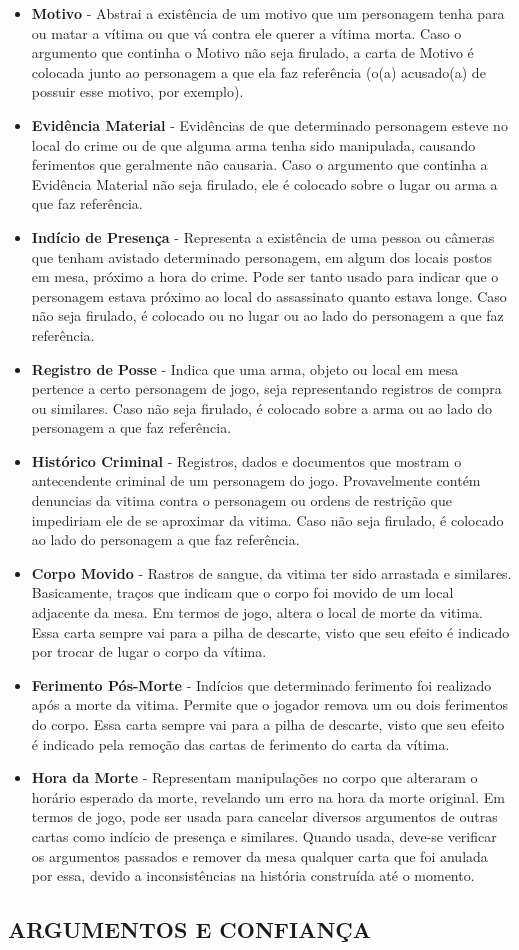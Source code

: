 \documentclass[a4paper, 11pt]{article}
\begin{document}
		\begin{itemize}
			\item \textbf{Motivo} - Abstrai a existência de um motivo que um personagem tenha para ou matar a vítima ou que vá contra ele querer a vítima morta. Caso o argumento que continha o Motivo não seja firulado, a carta de Motivo é colocada junto ao personagem a que ela faz referência (o(a) acusado(a) de possuir esse motivo, por exemplo).
			\item \textbf{Evidência Material} -  Evidências de que determinado personagem esteve no local do crime ou de que alguma arma tenha sido manipulada, causando ferimentos que geralmente não causaria. Caso o argumento que continha a Evidência Material não seja firulado, ele é colocado sobre o lugar ou arma a que faz referência.
			\item \textbf{Indício de Presença} - Representa a existência de uma pessoa ou câmeras que tenham avistado determinado personagem, em algum dos locais postos em mesa, próximo a hora do crime. Pode ser tanto usado para indicar que o personagem estava próximo ao local do assassinato quanto estava longe. Caso não seja firulado, é colocado ou no lugar ou ao lado do personagem a que faz referência.
			\item \textbf{Registro de Posse} - Indica que uma arma, objeto ou local em mesa pertence a certo personagem de jogo, seja representando registros de compra ou similares. Caso não seja firulado, é colocado sobre a arma ou ao lado do personagem a que faz referência.
			\item \textbf{Histórico Criminal} - Registros, dados e documentos que mostram o antecendente criminal de um personagem do jogo. Provavelmente contém denuncias da vitima contra o personagem ou ordens de restrição que impediriam ele de se aproximar da vitima. Caso não seja firulado, é colocado ao lado do personagem a que faz referência.
			\item \textbf{Corpo Movido} - Rastros de sangue, da vitima ter sido arrastada e similares. Basicamente, traços que indicam que o corpo foi movido de um local adjacente da mesa. Em termos de jogo, altera o local de morte da vitima. Essa carta sempre vai para a pilha de descarte, visto que seu efeito é indicado por trocar de lugar o corpo da vítima.
			\item \textbf{Ferimento Pós-Morte} - Indícios que determinado ferimento foi realizado após a morte da vitima. Permite que o jogador remova um ou dois ferimentos do corpo. Essa carta sempre vai para a pilha de descarte, visto que seu efeito é indicado pela remoção das cartas de ferimento do carta da vítima.
			\item \textbf{Hora da Morte} - Representam manipulações no corpo que alteraram o horário esperado da morte, revelando um erro na hora da morte original. Em termos de jogo, pode ser usada para cancelar diversos argumentos de outras cartas como indício de presença e similares. Quando usada, deve-se verificar os argumentos passados e remover da mesa qualquer carta que foi anulada por essa, devido a inconsistências na história construída até o momento.
		\end{itemize}

\subsection*{ARGUMENTOS E CONFIANÇA}
\end{document}
